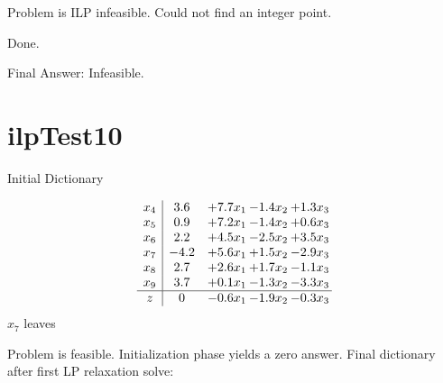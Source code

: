 \documentclass[11pt]{article}
\begin{document}
Problem is ILP infeasible. Could not find an integer point. 

Done.

Final Answer: Infeasible.

\section{ilpTest10}

Initial Dictionary 

\[\begin{array}{c| c c@{\hskip 2pt} c@{\hskip 2pt} c@{\hskip 2pt} }
 x_{4}   &  3.6 & + 7.7 x_{1} & -1.4 x_{2} & + 1.3 x_{3}\\
 x_{5}   &  0.9 & + 7.2 x_{1} & -1.4 x_{2} & + 0.6 x_{3}\\
 x_{6}   &  2.2 & + 4.5 x_{1} & -2.5 x_{2} & + 3.5 x_{3}\\
 x_{7}   &  -4.2 & + 5.6 x_{1} & + 1.5 x_{2} & -2.9 x_{3}\\
 x_{8}   &  2.7 & + 2.6 x_{1} & + 1.7 x_{2} & -1.1 x_{3}\\
 x_{9}   &  3.7 & + 0.1 x_{1} & -1.3 x_{2} & -3.3 x_{3}\\
\hline
z    &  0 & -0.6 x_{1} & -1.9 x_{2} & -0.3 x_{3}\\
\end{array}\]
$ x_{7} $ leaves 

 Problem is feasible. Initialization phase yields a zero answer. 
Final dictionary after first LP relaxation solve: 
\end{document}

